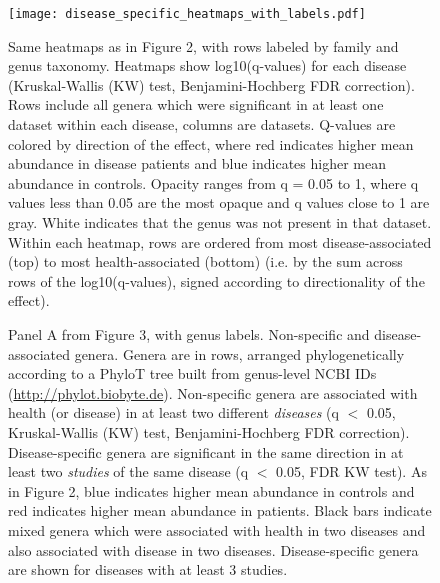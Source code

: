 \begin{figure}[h]
	\begin{centering}
	\texttt{[image: disease\_specific\_heatmaps\_with\_labels.pdf]}
	\caption{Same heatmaps as in Figure 2, with rows labeled by family and genus taxonomy. Heatmaps show log10(q-values) for each disease (Kruskal-Wallis (KW) test, Benjamini-Hochberg FDR correction). Rows include all genera which were significant in at least one dataset within each disease, columns are datasets. Q-values are colored by direction of the effect, where red indicates higher mean abundance in disease patients and blue indicates higher mean abundance in controls. Opacity ranges from q = 0.05 to 1, where q values less than 0.05 are the most opaque and q values close to 1 are gray. White indicates that the genus was not present in that dataset. Within each heatmap, rows are ordered from most disease-associated (top) to most health-associated (bottom) (i.e. by the sum across rows of the log10(q-values), signed according to directionality of the effect).
}
	\label{fig:supp_dis_specific}
	\end{centering}
\end{figure}


\FloatBarrier

\FloatBarrier

\begin{figure}[h]
	\begin{center}
    \captionsetup{font=footnotesize,labelfont=footnotesize}
	\caption{Panel A from Figure 3, with genus labels. Non-specific and disease-associated genera. Genera are in rows, arranged phylogenetically according to a PhyloT tree built from genus-level NCBI IDs (\url{http://phylot.biobyte.de}). Non-specific genera are associated with health (or disease) in at least two different \textit{diseases} (q $<$ 0.05, Kruskal-Wallis (KW) test, Benjamini-Hochberg FDR correction). Disease-specific genera are significant in the same direction in at least two \textit{studies} of the same disease (q $<$ 0.05, FDR KW test). As in Figure 2, blue indicates higher mean abundance in controls and red indicates higher mean abundance in patients. Black bars indicate mixed genera which were associated with health in two diseases and also associated with disease in two diseases. Disease-specific genera are shown for diseases with at least 3 studies.
}
	\label{fig:supp_meta_heatmap}
	\end{center}
\end{figure}


